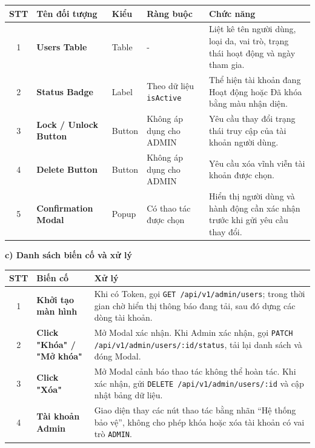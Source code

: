 \documentclass[12pt,a4paper]{article}
\begin{document}
\begin{center}
\renewcommand{\arraystretch}{1.5}
\begin{tabularx}{\textwidth}{|c|l|l|l|X|}
\hline
\rowcolor{blue!20}
\textbf{STT} & \textbf{Tên đối tượng} & \textbf{Kiểu} & \textbf{Ràng buộc} & \textbf{Chức năng} \\ \hline

1 & \textbf{Users Table} & Table & - & Liệt kê tên người dùng, loại da, vai trò, trạng thái hoạt động và ngày tham gia. \\ \hline

2 & \textbf{Status Badge} & Label & Theo dữ liệu \texttt{isActive} & Thể hiện tài khoản đang Hoạt động hoặc Đã khóa bằng màu nhận diện. \\ \hline

3 & \textbf{Lock / Unlock Button} & Button & Không áp dụng cho ADMIN & Yêu cầu thay đổi trạng thái truy cập của tài khoản người dùng. \\ \hline

4 & \textbf{Delete Button} & Button & Không áp dụng cho ADMIN & Yêu cầu xóa vĩnh viễn tài khoản được chọn. \\ \hline

5 & \textbf{Confirmation Modal} & Popup & Có thao tác được chọn & Hiển thị người dùng và hành động cần xác nhận trước khi gửi yêu cầu thay đổi. \\ \hline

\end{tabularx}
\end{center}

\textbf{c) Danh sách biến cố và xử lý}

\begin{center}
\renewcommand{\arraystretch}{1.5}
\begin{tabularx}{\textwidth}{|c|l|X|}
\hline
\rowcolor{blue!20}
\textbf{STT} & \textbf{Biến cố} & \textbf{Xử lý} \\ \hline

1 & \textbf{Khởi tạo màn hình} & Khi có Token, gọi \texttt{GET /api/v1/admin/users}; trong thời gian chờ hiển thị thông báo đang tải, sau đó dựng các dòng tài khoản. \\ \hline

2 & \textbf{Click "Khóa" / "Mở khóa"} & Mở Modal xác nhận. Khi Admin xác nhận, gọi \texttt{PATCH /api/v1/admin/users/:id/status}, tải lại danh sách và đóng Modal. \\ \hline

3 & \textbf{Click "Xóa"} & Mở Modal cảnh báo thao tác không thể hoàn tác. Khi xác nhận, gửi \texttt{DELETE /api/v1/admin/users/:id} và cập nhật bảng dữ liệu. \\ \hline

4 & \textbf{Tài khoản Admin} & Giao diện thay các nút thao tác bằng nhãn ``Hệ thống bảo vệ'', không cho phép khóa hoặc xóa tài khoản có vai trò \texttt{ADMIN}. \\ \hline

\end{tabularx}
\end{center}
\end{document}
